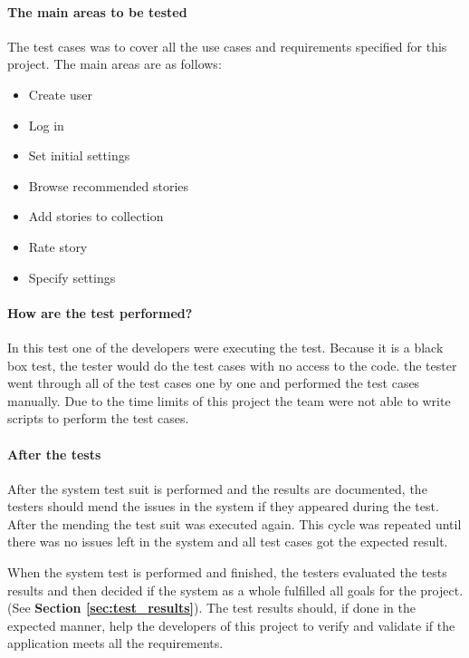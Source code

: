 {\paragraph{The main areas to be tested}
The test cases was to cover all the use cases and requirements specified for this project. The main areas are as follows:
\begin{itemize}[noitemsep]
	\item Create user
	\item Log in
	\item Set initial settings
	\item Browse recommended stories
	\item Add stories to collection
	\item Rate story 
	\item Specify settings \newline
\end{itemize}

\paragraph{How are the test performed?}
In this test one of the developers were executing the test. Because it is a black box test, the tester would do the test cases with no access to the code. the tester went through all of the test cases one by one and performed the test cases manually. Due to the time limits of this project the team were not able to write scripts to perform the test cases. \newline

\paragraph{After the tests}
After the system test suit is performed and the results are documented, the testers should mend the issues in the system if they appeared during the test. After the mending the test suit was executed again. This cycle was repeated until there was no issues left in the system and all test cases got the expected result.\newline

When the system test is performed and finished, the testers evaluated the tests results and then decided if the system as a whole fulfilled all goals for the project.(See \textbf{Section \ref{sec:test_results}}). The test results should, if done in the expected manner, help the developers of this project to verify and validate if the application meets all the requirements.\newline

}
